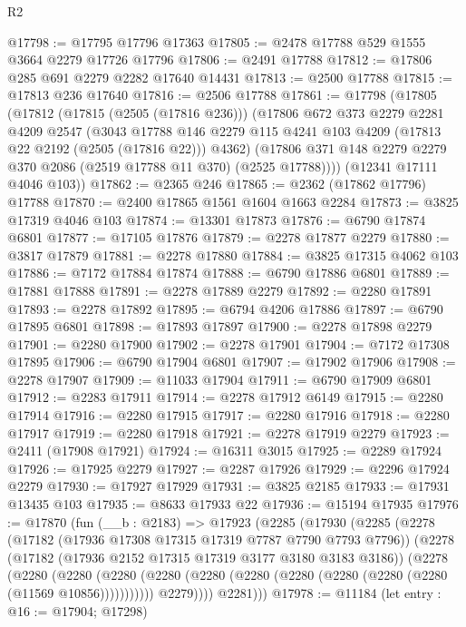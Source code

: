 \begin{lexlean}{R2}
\begin{coremodule}
@17798 := @17795 @17796 @17363
@17805 := @2478 @17788 @529 @1555 @3664 @2279 @17726 @17796
@17806 := @2491 @17788
@17812 := @17806 @285 @691 @2279 @2282 @17640 @14431
@17813 := @2500 @17788
@17815 := @17813 @236 @17640
@17816 := @2506 @17788
@17861 := @17798
    (@17805
      (@17812
        (@17815 (@2505 (@17816 @236)))
        (@17806
          @672
          @373
          @2279
          @2281
          @4209
          @2547
          (@3043
            @17788
            @146
            @2279
            @115
            @4241
            @103
            @4209
            (@17813 @22 @2192 (@2505 (@17816 @22)))
            @4362)
          (@17806 @371 @148 @2279 @2279 @370 @2086 (@2519 @17788 @11 @370) (@2525 @17788))))
      (@12341 @17111 @4046 @103))
@17862 := @2365 @246
@17865 := @2362 (@17862 @17796) @17788
@17870 := @2400 @17865 @1561 @1604 @1663 @2284
@17873 := @3825 @17319 @4046 @103
@17874 := @13301 @17873
@17876 := @6790 @17874 @6801
@17877 := @17105 @17876
@17879 := @2278 @17877 @2279
@17880 := @3817 @17879
@17881 := @2278 @17880
@17884 := @3825 @17315 @4062 @103
@17886 := @7172 @17884 @17874
@17888 := @6790 @17886 @6801
@17889 := @17881 @17888
@17891 := @2278 @17889 @2279
@17892 := @2280 @17891
@17893 := @2278 @17892
@17895 := @6794 @4206 @17886
@17897 := @6790 @17895 @6801
@17898 := @17893 @17897
@17900 := @2278 @17898 @2279
@17901 := @2280 @17900
@17902 := @2278 @17901
@17904 := @7172 @17308 @17895
@17906 := @6790 @17904 @6801
@17907 := @17902 @17906
@17908 := @2278 @17907
@17909 := @11033 @17904
@17911 := @6790 @17909 @6801
@17912 := @2283 @17911
@17914 := @2278 @17912 @6149
@17915 := @2280 @17914
@17916 := @2280 @17915
@17917 := @2280 @17916
@17918 := @2280 @17917
@17919 := @2280 @17918
@17921 := @2278 @17919 @2279
@17923 := @2411 (@17908 @17921)
@17924 := @16311 @3015
@17925 := @2289 @17924
@17926 := @17925 @2279
@17927 := @2287 @17926
@17929 := @2296 @17924 @2279
@17930 := @17927 @17929
@17931 := @3825 @2185
@17933 := @17931 @13435 @103
@17935 := @8633 @17933 @22
@17936 := @15194 @17935
@17976 := @17870
    (fun (__b : @2183) =>
    @17923
      (@2285
        (@17930
          (@2285
            (@2278
              (@17182 (@17936 @17308 @17315 @17319 @7787 @7790 @7793 @7796))
              (@2278
                (@17182 (@17936 @2152 @17315 @17319 @3177 @3180 @3183 @3186))
                (@2278
                  (@2280
                    (@2280
                      (@2280
                        (@2280 (@2280 (@2280 (@2280 (@2280 (@2280 (@2280 (@11569 @10856)))))))))))
                  @2279))))
          @2281)))
@17978 := @11184 (let entry : @16 := @17904; @17298)

\end{coremodule}
\end{lexlean}
